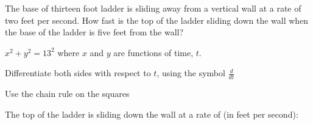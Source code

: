 \documentclass{ximera}
\begin{document}
\begin{question}
The base of thirteen foot ladder is sliding away from a vertical wall at a rate of two 
feet per second.  How fast is the top of the ladder sliding down the wall when the base of the 
ladder is five feet from the wall?
\begin{hint}
$x^2 + y^2 = 13^2$ where  $x$ and $y$ are functions of time, $t$.
\end{hint}

\begin{hint}
Differentiate both sides with respect to $t$, using the symbol $\frac{d}{dt}$
\end{hint}
\begin{hint}
Use the chain rule on the squares
\end{hint}

The top of the ladder is sliding down the wall at a rate of (in feet per second):
\begin{multipleChoice}
\end{multipleChoice}
\end{question}
\end{document}
